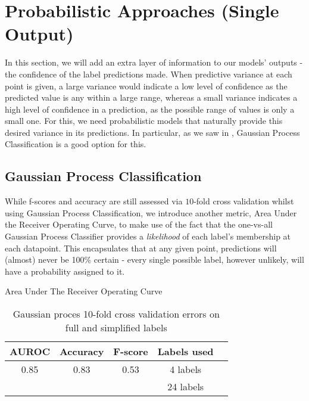 \section{Probabilistic Approaches (Single Output)}

In this section, we will add an extra layer of information to our models' outputs - the confidence of the label predictions made. When predictive variance at each point is given, a large variance would indicate a low level of confidence as the predicted value is any within a large range, whereas a small variance indicates a high level of confidence in a prediction, as the possible range of values is only a small one. For this, we need probabilistic models that naturally provide this desired variance in its predictions. In particular, as we saw in , Gaussian Process Classification is a good option for this.

\subsection{Gaussian Process Classification}

While f-scores and accuracy are still assessed via $10$-fold cross validation whilst using Gaussian Process Classification, we introduce another metric, Area Under the Receiver Operating Curve, to make use of the fact that the one-vs-all Gaussian Process Classifier provides a \textit{likelihood} of each label's membership at each datapoint. This encapsulates that at any given point, predictions will (almost) never be 100\% certain - every single possible label, however unlikely, will have a probability assigned to it. 

Area Under The Receiver Operating Curve

\begin{table}[H]
    \centering
\begin{tabular}{|c|c|c|c|c|}
    \hline
    AUROC & Accuracy & F-score & Labels used\\\hline
    0.85 & 0.83 & 0.53 & 4 labels \\
    & & & 24 labels \\
    \hline
\end{tabular}
    \caption{Gaussian proces 10-fold cross validation errors on full and simplified labels}
    \label{table:gperrs}
\end{table}

